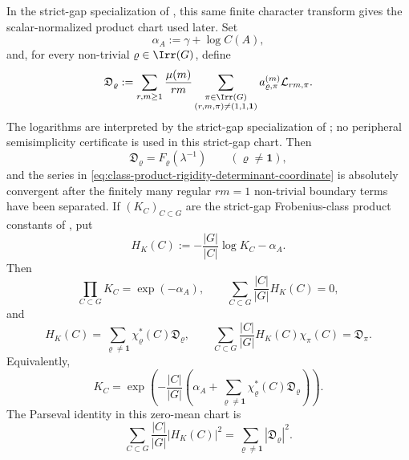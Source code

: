 \begin{corollary}
  In the strict-gap specialization of
  , this same finite character transform
  gives the scalar-normalized product chart used later.  Set
  \[
    \alpha_A:=\gamma+\log C(A),
  \]
  and, for every non-trivial \(\varrho\in\Irr(G)\), define
  \begin{equation}\label{eq:class-product-rigidity-determinant-coordinate}
    \mathfrak D_\varrho:=
    \sum_{r,m\ge1}\frac{\mu(m)}{rm}
      \sum_{\substack{\pi\in\Irr(G)\\(r,m,\pi)\neq(1,1,\mathbf1)}}
        a_{\varrho,\pi}^{(m)}
        \mathcal L_{rm,\pi}.
  \end{equation}
  The logarithms are interpreted by the strict-gap specialization of
  ; no peripheral
  semisimplicity certificate is used in this strict-gap chart.  Then
  \begin{equation}\label{eq:class-product-rigidity-d-equals-f}
    \mathfrak D_\varrho=F_\varrho(\lambda^{-1})
    \qquad(\varrho\ne\mathbf1),
  \end{equation}
  and the series in
  \eqref{eq:class-product-rigidity-determinant-coordinate} is absolutely
  convergent after the finitely many regular \(rm=1\) non-trivial boundary
  terms have been separated.  If \((K_C)_{C\subset G}\) are the strict-gap
  Frobenius-class product constants of
  , put
  \begin{equation}\label{eq:class-product-log-vector}
    H_K(C):=-\frac{|G|}{|C|}\log K_C-\alpha_A .
  \end{equation}
  Then
  \begin{equation}\label{eq:class-product-normalisation-constraint}
    \prod_{C\subset G}K_C=\exp(-\alpha_A),
    \qquad
    \sum_{C\subset G}\frac{|C|}{|G|}H_K(C)=0,
  \end{equation}
  \label{eq:class-product-rigidity-hyperplane}
  and
  \begin{equation}\label{eq:class-product-fourier-coordinates}
    H_K(C)=
    \sum_{\varrho\ne\mathbf1}
      \chi_\varrho^\ast(C)\mathfrak D_\varrho,
    \qquad
    \sum_{C\subset G}\frac{|C|}{|G|}H_K(C)\chi_\pi(C)
    =\mathfrak D_\pi.
  \end{equation}
  \label{eq:class-product-rigidity-forward}
  Equivalently,
  \begin{equation}\label{eq:class-product-rigidity-product-formula}
    K_C=
    \exp\!\left(
      -\frac{|C|}{|G|}
      \left(
        \alpha_A+
        \sum_{\varrho\ne\mathbf1}
          \chi_\varrho^\ast(C)\mathfrak D_\varrho
      \right)
    \right).
  \end{equation}
  The Parseval identity in this zero-mean chart is
  \begin{equation}\label{eq:class-product-parseval}
    \sum_{C\subset G}\frac{|C|}{|G|}|H_K(C)|^2
    =
    \sum_{\varrho\ne\mathbf1}|\mathfrak D_\varrho|^2.
  \end{equation}
  \label{eq:class-product-rigidity-parseval}


\end{corollary}
